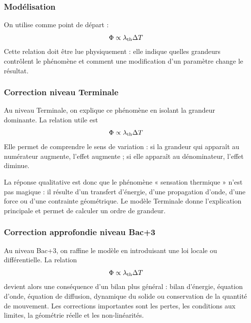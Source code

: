 \documentclass[11pt,a4paper]{article}
\begin{document}
\subsubsection*{Modélisation}

\begin{theorembox}
On utilise comme point de départ :
\[
\Phi\propto \lambda_{\rm th}\Delta T
\]
Cette relation doit être lue physiquement : elle indique quelles grandeurs contrôlent le phénomène et comment une modification d'un paramètre change le résultat.
\end{theorembox}

\subsubsection*{Correction niveau Terminale}

\begin{corrigebox}

Au niveau Terminale, on explique ce phénomène en isolant la grandeur dominante. La relation utile est
\[
\Phi\propto \lambda_{\rm th}\Delta T
\]
Elle permet de comprendre le sens de variation : si la grandeur qui apparaît au numérateur augmente, l'effet augmente ; si elle apparaît au dénominateur, l'effet diminue.

La réponse qualitative est donc que le phénomène « sensation thermique » n'est pas magique : il résulte d'un transfert d'énergie, d'une propagation d'onde, d'une force ou d'une contrainte géométrique. Le modèle Terminale donne l'explication principale et permet de calculer un ordre de grandeur.

\end{corrigebox}

\subsubsection*{Correction approfondie niveau Bac+3}

\begin{approfondissementbox}

Au niveau Bac+3, on raffine le modèle en introduisant une loi locale ou différentielle. La relation
\[
\Phi\propto \lambda_{\rm th}\Delta T
\]
devient alors une conséquence d'un bilan plus général : bilan d'énergie, équation d'onde, équation de diffusion, dynamique du solide ou conservation de la quantité de mouvement. Les corrections importantes sont les pertes, les conditions aux limites, la géométrie réelle et les non-linéarités.

\end{approfondissementbox}
\end{document}
